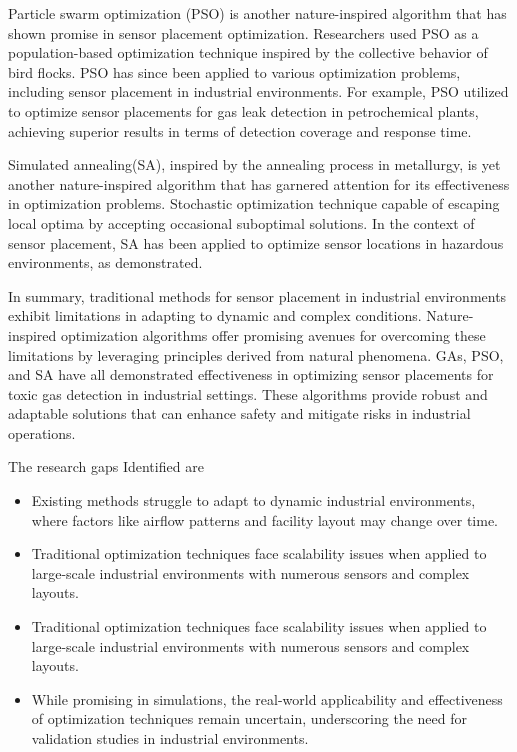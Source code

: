 \documentclass[conference]{IEEEtran}
\begin{document}
Particle swarm optimization (PSO) is another nature-inspired algorithm that has shown promise in sensor placement optimization. Researchers used PSO as a population-based optimization technique inspired by the collective behavior of bird flocks\cite{ramasamy2021fuzzy}. PSO has since been applied to various optimization problems, including sensor placement in industrial environments. For example, PSO utilized to optimize sensor placements for gas leak detection in petrochemical plants, achieving superior results in terms of detection coverage and response time\cite{boatwright2023integrated}.

Simulated annealing(SA), inspired by the annealing process in metallurgy, is yet another nature-inspired algorithm that has garnered attention for its effectiveness in optimization problems. Stochastic optimization technique capable of escaping local optima by accepting occasional suboptimal solutions. In the context of sensor placement, SA has been applied to optimize sensor locations in hazardous environments, as demonstrated\cite{kumar2024hybrid}. 

In summary, traditional methods for sensor placement in industrial environments exhibit limitations in adapting to dynamic and complex conditions\cite{madhavi2023pythagorean}. Nature-inspired optimization algorithms offer promising avenues for overcoming these limitations by leveraging principles derived from natural phenomena. GAs, PSO, and SA have all demonstrated effectiveness in optimizing sensor placements for toxic gas detection in industrial settings. These algorithms provide robust and adaptable solutions that can enhance safety and mitigate risks in industrial operations.

The research gaps Identified are
\begin{itemize}
\item  Existing methods struggle to adapt to dynamic industrial environments, where factors like airflow patterns and facility layout may change over time.
\item Traditional optimization techniques face scalability issues when applied to large-scale industrial environments with numerous sensors and complex layouts.
\item Traditional optimization techniques face scalability issues when applied to large-scale industrial environments with numerous sensors and complex layouts.
\item While promising in simulations, the real-world applicability and effectiveness of optimization techniques remain uncertain, underscoring the need for validation studies in industrial environments.
\end{itemize}
\end{document}
